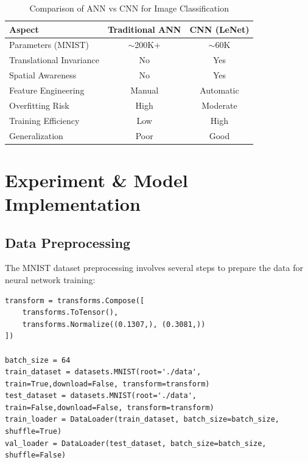 \documentclass[a4paper, journal]{IEEEtran}
\begin{document}
\begin{table}[h]    \centering
    \caption{Comparison of ANN vs CNN for Image Classification}
    \label{tab:ann_vs_cnn_comparison}
    \begin{tabular}{lcc}
        \toprule
        \textbf{Aspect}          & \textbf{Traditional ANN} & \textbf{CNN (LeNet)} \\
        \midrule
        Parameters (MNIST)       & $\sim$200K+              & $\sim$60K            \\
        Translational Invariance & No                       & Yes                  \\
        Spatial Awareness        & No                       & Yes                  \\
        Feature Engineering      & Manual                   & Automatic            \\
        Overfitting Risk         & High                     & Moderate             \\
        Training Efficiency      & Low                      & High                 \\
        Generalization           & Poor                     & Good                 \\
        \bottomrule
    \end{tabular}
\end{table}


\section{Experiment \& Model Implementation}

\subsection{Data Preprocessing}

The MNIST dataset preprocessing involves several steps to prepare the data for neural network training:

\begin{lstlisting}[caption=Data Preprocessing Setup]
transform = transforms.Compose([
    transforms.ToTensor(),
    transforms.Normalize((0.1307,), (0.3081,))
])

batch_size = 64
train_dataset = datasets.MNIST(root='./data', train=True,download=False, transform=transform)
test_dataset = datasets.MNIST(root='./data', train=False,download=False, transform=transform)
train_loader = DataLoader(train_dataset, batch_size=batch_size, shuffle=True)
val_loader = DataLoader(test_dataset, batch_size=batch_size, shuffle=False)
\end{lstlisting}
\end{document}
